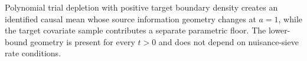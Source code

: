 Polynomial trial depletion with positive target boundary density creates an identified causal mean whose source information geometry changes at \(a=1\), while the target covariate sample contributes a separate parametric floor. The lower-bound geometry is present for every \(t>0\) and does not depend on nuisance-sieve rate conditions.